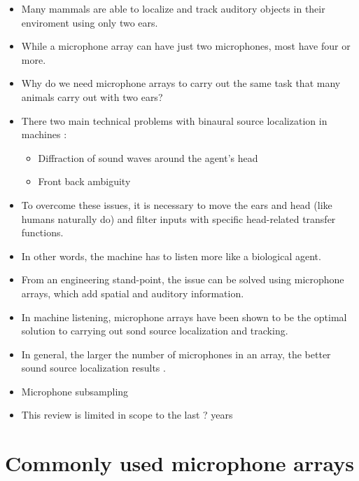 \documentclass[14pt, oneside]{extarticle}
\begin{document}
\begin{itemize}

\item Many mammals are able to localize and track auditory objects in their enviroment using only two ears.

\item While a microphone array can have just two microphones, most have four or more. 

\item Why do we need microphone arrays to carry out the same task that many animals carry out with two ears?

\item There two main technical problems with binaural source localization in machines \cite{kim2015improved}:
	\begin{itemize}
	\item Diffraction of sound waves around the agent's head
	\item Front back ambiguity
	\end{itemize}

\item To overcome these issues, it is necessary to move the ears and head (like humans naturally do) and filter inputs with specific head-related transfer functions.

\item In other words, the machine has to listen more like a biological agent.
	
\item From an engineering stand-point, the issue can be solved using microphone arrays, which add spatial and auditory information. 

\item In machine listening, microphone arrays have been shown to be the optimal solution to carrying out sond source localization and tracking.

\item In general, the larger the number of microphones in an array, the better sound source localization results \cite{valin2007robust}.

\item Microphone subsampling

\item This review is limited in scope to the last ? years

\end{itemize}

\section{Commonly used microphone arrays}
\end{document}
